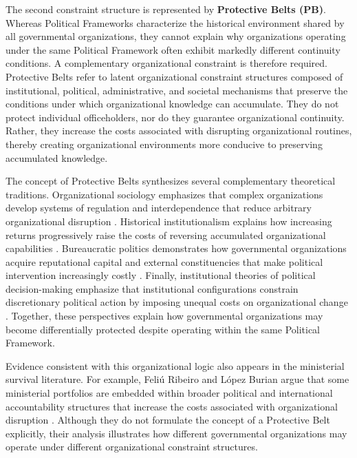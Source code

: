 \documentclass[doc, 12pt, a4paper,floatsintext]{apa7}
\begin{document}
The second constraint structure is represented by \textbf{Protective Belts (PB)}. Whereas Political Frameworks characterize the historical environment shared by all governmental organizations, they cannot explain why organizations operating under the same Political Framework often exhibit markedly different continuity conditions. A complementary organizational constraint is therefore required.
%
Protective Belts refer to latent organizational constraint structures composed of institutional, political, administrative, and societal mechanisms that preserve the conditions under which organizational knowledge can accumulate. They do not protect individual officeholders, nor do they guarantee organizational continuity. Rather, they increase the costs associated with disrupting organizational routines, thereby creating organizational environments more conducive to preserving accumulated knowledge.

The concept of Protective Belts synthesizes several complementary theoretical traditions. Organizational sociology emphasizes that complex organizations develop systems of regulation and interdependence that reduce arbitrary organizational disruption \parencite{crozier_regulation_1976}. Historical institutionalism explains how increasing returns progressively raise the costs of reversing accumulated organizational capabilities \parencite{pierson_increasing_2000}. Bureaucratic politics demonstrates how governmental organizations acquire reputational capital and external constituencies that make political intervention increasingly costly \parencite{carpenter_forging_2020}. Finally, institutional theories of political decision-making emphasize that institutional configurations constrain discretionary political action by imposing unequal costs on organizational change \parencite{tsebelis_decision_1995}. Together, these perspectives explain how governmental organizations may become differentially protected despite operating within the same Political Framework.

Evidence consistent with this organizational logic also appears in the ministerial survival literature. For example, Feliú Ribeiro and López Burian argue that some ministerial portfolios are embedded within broader political and international accountability structures that increase the costs associated with organizational disruption \parencite{feliu_ribeiro_foreign_2023}. Although they do not formulate the concept of a Protective Belt explicitly, their analysis illustrates how different governmental organizations may operate under different organizational constraint structures.
\end{document}
